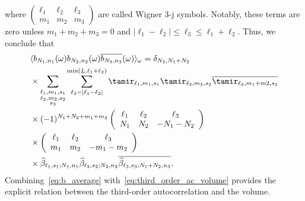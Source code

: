 \documentclass[9pt,twocolumn,twoside,lineno]{pnas-new}
\begin{document}
where  $\left(\begin{array}{ccc} \ell_1 & \ell_2 & \ell_3\\ m_1 & m_2 & m_3\end{array}\right)$ are called Wigner 3-j symbols. 
Notably, these terms are zero unless $m_1+m_2+m_3=0$ and $|\ell_1-\ell_2|\leq \ell_3\leq \ell_1+\ell_2$. Thus,  we conclude that 
\begin{align} \label{eq:b_average}
&\langle b_{N_1,n_1}(\omega)b_{N_2,n_2}(\omega)\overline{b_{N_3,n_3}}(\omega)\rangle_{\omega} = \delta_{N_3,N_1+N_2}\\&\times \sum_{\substack{\ell_1,m_1,s_1\\\ell_2,m_2,s_2\\s_3}}\sum_{\ell_3=|\ell_1-\ell_2|}^{\min(L,\ell_1+\ell_2)}\tamir_{\ell_1,m_1,s_1}\tamir_{\ell_2,m_2,s_2}\overline{\tamir_{\ell_3,m_1+m2,s_3}}\nonumber\\
&\times (-1)^{N_1+N_2+m_1+m_2}\left(\begin{array}{ccc}\ell_1 & \ell_2  & \ell_3\\ N_1 & N_2 & -N_1-N_2\end{array}\right)\nonumber\\&\times \left(\begin{array}{ccc}\ell_1 & \ell_2  & \ell_3\\ m_1 & m_2 & -m_1-m_2\end{array}\right)\nonumber\\
&\times \widehat\beta_{\ell_1,s_1;N_1,n_1}\widehat\beta_{\ell_2,s_2;N_2,n_2}\overline{\widehat\beta_{\ell_3,s_3;N_1+N_2,n_3}}. \nonumber
\end{align}
Combining~\eqref{eq:b_average} with~\eqref{eq:third_order_ac_volume} provides the explicit relation between the third-order autocorrelation and the volume.   
\end{document}
